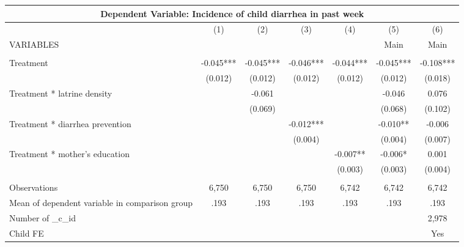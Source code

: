 \begin{tabular}{lcccccc}
\multicolumn{7}{c}{Dependent Variable: Incidence of child diarrhea in past week} \\ \hline
 & (1) & (2) & (3) & (4) & (5) & (6) \\
VARIABLES &  &  &  &  & Main & Main \\ \hline
 &  &  &  &  &  &  \\
Treatment & -0.045*** & -0.045*** & -0.046*** & -0.044*** & -0.045*** & -0.108*** \\
 & (0.012) & (0.012) & (0.012) & (0.012) & (0.012) & (0.018) \\
Treatment * latrine density &  & -0.061 &  &  & -0.046 & 0.076 \\
 &  & (0.069) &  &  & (0.068) & (0.102) \\
Treatment * diarrhea prevention &  &  & -0.012*** &  & -0.010** & -0.006 \\
 &  &  & (0.004) &  & (0.004) & (0.007) \\
Treatment * mother's education &  &  &  & -0.007** & -0.006* & 0.001 \\
 &  &  &  & (0.003) & (0.003) & (0.004) \\
 &  &  &  &  &  &  \\
Observations & 6,750 & 6,750 & 6,750 & 6,742 & 6,742 & 6,742 \\
Mean of dependent variable in comparison group & .193 & .193 & .193 & .193 & .193 & .193 \\
Number of \_c\_id &  &  &  &  &  & 2,978 \\
 Child FE &  &  &  &  &  & Yes \\ \hline
\end{tabular}

